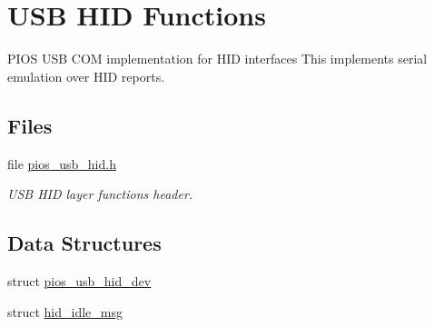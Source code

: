 \hypertarget{group___p_i_o_s___u_s_b___h_i_d}{\section{U\-S\-B H\-I\-D Functions}
\label{group___p_i_o_s___u_s_b___h_i_d}
}


P\-I\-O\-S U\-S\-B C\-O\-M implementation for H\-I\-D interfaces  This implements serial emulation over H\-I\-D reports.  


\subsection*{Files}
\begin{DoxyCompactItemize}
\item 
file \hyperlink{pios__usb__hid_8h}{pios\-\_\-usb\-\_\-hid.\-h}
\begin{DoxyCompactList}\small\item\em U\-S\-B H\-I\-D layer functions header. \end{DoxyCompactList}\end{DoxyCompactItemize}
\subsection*{Data Structures}
\begin{DoxyCompactItemize}
\item 
struct \hyperlink{structpios__usb__hid__dev}{pios\-\_\-usb\-\_\-hid\-\_\-dev}
\item 
struct \hyperlink{structhid__idle__msg}{hid\-\_\-idle\-\_\-msg}
\end{DoxyCompactItemize}
